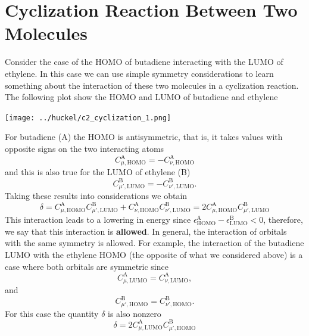 \documentclass[../Main/chem532-notes.tex]{subfiles}
\begin{document}
\section{Cyclization Reaction Between Two Molecules}
Consider the case of the HOMO of butadiene interacting with the LUMO of ethylene. In this case we can use simple symmetry considerations to learn something about the interaction of these two molecules in a cyclization reaction. The following plot show the HOMO and LUMO of butadiene and ethylene

\begin{center}
\texttt{[image: ../huckel/c2\_cyclization\_1.png]}
\end{center}

For butadiene (A) the HOMO is antisymmetric, that is, it takes values with opposite signs on the two interacting atoms
\begin{equation}
C_{\mu,\mathrm{HOMO}}^\mathrm{A} = -C_{\nu,\mathrm{HOMO}}^\mathrm{A}
\end{equation}
and this is also true for the LUMO of ethylene (B)
\begin{equation}
C_{\mu',\mathrm{LUMO}}^\mathrm{B} = -C_{\nu',\mathrm{LUMO}}^\mathrm{B}.
\end{equation}
Taking these results into considerations we obtain
\begin{equation}
\delta = C_{\mu,\mathrm{HOMO}}^\mathrm{A} C_{\mu',\mathrm{LUMO}}^\mathrm{B}
+
C_{\nu,\mathrm{HOMO}}^\mathrm{A} C_{\nu',\mathrm{LUMO}}^\mathrm{B}
= 
2 C_{\mu,\mathrm{HOMO}}^\mathrm{A} C_{\mu',\mathrm{LUMO}}^\mathrm{B}
\end{equation}
This interaction leads to a lowering in energy since ${\epsilon^\mathrm{A}_{\mathrm{HOMO}}- \epsilon^\mathrm{B}_{\mathrm{LUMO}}} < 0$, therefore, we say that this interaction is \textbf{allowed}.
In general, the interaction of orbitals with the same symmetry is allowed.
For example, the interaction of the butadiene LUMO with the ethylene HOMO (the opposite of what we considered above) is a case where both orbitals are symmetric since
\begin{equation}
C_{\mu,\mathrm{LUMO}}^\mathrm{A} = C_{\nu,\mathrm{LUMO}}^\mathrm{A},
\end{equation}
and
\begin{equation}
C_{\mu',\mathrm{HOMO}}^\mathrm{B} = C_{\nu',\mathrm{HOMO}}^\mathrm{B}.
\end{equation}
For this case the quantity $\delta$ is also nonzero
\begin{equation}
\delta = 2 C_{\mu,\mathrm{LUMO}}^\mathrm{A} C_{\mu',\mathrm{HOMO}}^\mathrm{B}
\end{equation}
\end{document}
